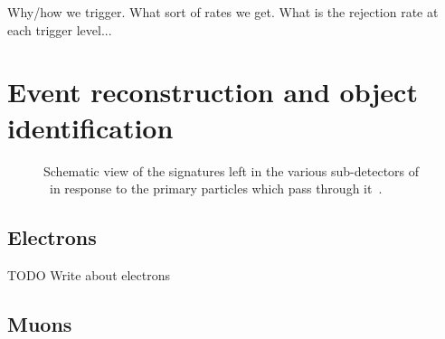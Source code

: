 {\color{red} Why/how we trigger. What sort of rates we get. What is the
rejection rate at each trigger level...}

\FloatBarrier
\section{Event reconstruction and object identification}
\label{sec:event_reco}

\begin{figure}[ht]
  \caption{
    Schematic view of the signatures left in the various sub-detectors of
    \atlas\ in response to the primary particles which pass through
    it~\cite{Pequenao:1505342}.
  }
  \label{fig:particle_signatures}
\end{figure}

\FloatBarrier
\subsection{Electrons} 
\label{sec:elctrons}

{\color{red} TODO Write about electrons}

\FloatBarrier
\subsection{Muons} 
\label{sec:muons}

